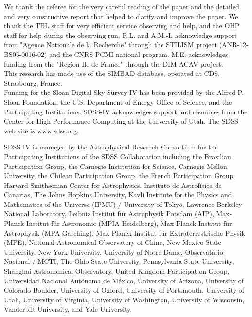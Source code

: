 \documentclass[printer]{aa} %
\begin{document}
\begin{acknowledgements}

We thank the referee for the very careful reading of the paper and the detailed and very constructive report that helped to clarify and improve the paper. We thank the TBL staff for very efficient service observing and help, and the OHP staff for help during the observing run. R.L. and A.M.-I. acknowledge support from "Agence Nationale de la Recherche" through the STILISM project (ANR-12-BS05-0016-02) and the CNRS PCMI national program.
M.E. acknowledges funding from the "Region Ile-de-France" through the DIM-ACAV project.\\

This research has made use of the SIMBAD database, operated at CDS, Strasbourg, France.\\
 
Funding for the Sloan Digital Sky Survey IV has been provided by
the Alfred P. Sloan Foundation, the U.S. Department of Energy Office of
Science, and the Participating Institutions. SDSS-IV acknowledges
support and resources from the Center for High-Performance Computing at
the University of Utah. The SDSS web site is www.sdss.org.

SDSS-IV is managed by the Astrophysical Research Consortium for the 
Participating Institutions of the SDSS Collaboration including the 
Brazilian Participation Group, the Carnegie Institution for Science, 
Carnegie Mellon University, the Chilean Participation Group, the French Participation Group, Harvard-Smithsonian Center for Astrophysics, 
Instituto de Astrof\'isica de Canarias, The Johns Hopkins University, 
Kavli Institute for the Physics and Mathematics of the Universe (IPMU) / University of Tokyo, Lawrence Berkeley National Laboratory, 
Leibniz Institut f\"ur Astrophysik Potsdam (AIP),  
Max-Planck-Institut f\"ur Astronomie (MPIA Heidelberg), 
Max-Planck-Institut f\"ur Astrophysik (MPA Garching), 
Max-Planck-Institut f\"ur Extraterrestrische Physik (MPE), 
National Astronomical Observatory of China, New Mexico State University, New York University, University of Notre Dame, 
Observat\'ario Nacional / MCTI, The Ohio State University, 
Pennsylvania State University, Shanghai Astronomical Observatory, 
United Kingdom Participation Group,
Universidad Nacional Aut\'onoma de M\'exico, University of Arizona, 
University of Colorado Boulder, University of Oxford, University of Portsmouth, 
University of Utah, University of Virginia, University of Washington, University of Wisconsin, 
Vanderbilt University, and Yale University.      
\end{acknowledgements}
\end{document}
